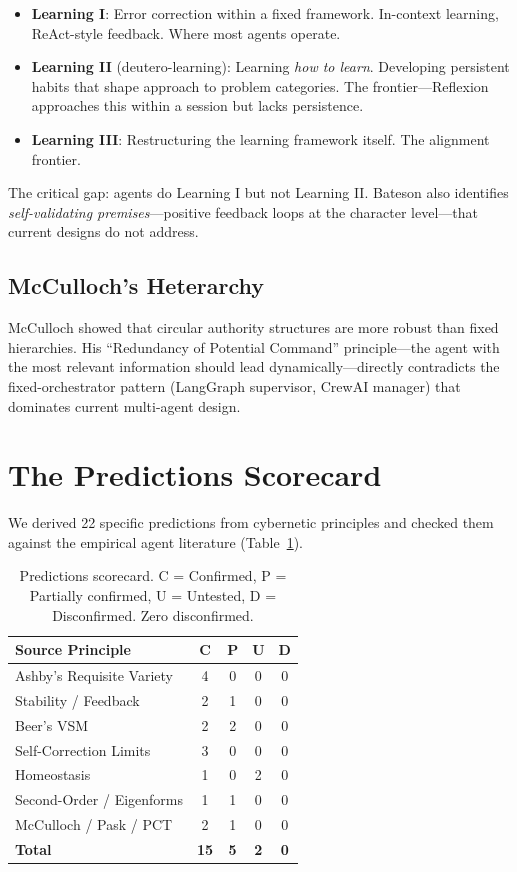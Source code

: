 \documentclass[11pt]{article}
\begin{document}
\begin{itemize}
\item \textbf{Learning I}: Error correction within a fixed framework. In-context learning, ReAct-style feedback. Where most agents operate.
\item \textbf{Learning II} (deutero-learning): Learning \emph{how to learn}. Developing persistent habits that shape approach to problem categories. The frontier---Reflexion approaches this within a session but lacks persistence.
\item \textbf{Learning III}: Restructuring the learning framework itself. The alignment frontier.
\end{itemize}

The critical gap: agents do Learning I but not Learning II. Bateson also identifies \emph{self-validating premises}---positive feedback loops at the character level---that current designs do not address.

\subsection{McCulloch's Heterarchy}

McCulloch \citeyear{mcculloch1945heterarchy} showed that circular authority structures are more robust than fixed hierarchies. His ``Redundancy of Potential Command'' principle---the agent with the most relevant information should lead dynamically---directly contradicts the fixed-orchestrator pattern (LangGraph supervisor, CrewAI manager) that dominates current multi-agent design.

\section{The Predictions Scorecard}

We derived 22 specific predictions from cybernetic principles and checked them against the empirical agent literature (Table~\ref{tab:predictions}).

\begin{table}[t]
\centering
\small
\begin{tabular}{lcccc}
\toprule
\textbf{Source Principle} & \textbf{C} & \textbf{P} & \textbf{U} & \textbf{D} \\
\midrule
Ashby's Requisite Variety & 4 & 0 & 0 & 0 \\
Stability / Feedback & 2 & 1 & 0 & 0 \\
Beer's VSM & 2 & 2 & 0 & 0 \\
Self-Correction Limits & 3 & 0 & 0 & 0 \\
Homeostasis & 1 & 0 & 2 & 0 \\
Second-Order / Eigenforms & 1 & 1 & 0 & 0 \\
McCulloch / Pask / PCT & 2 & 1 & 0 & 0 \\
\midrule
\textbf{Total} & \textbf{15} & \textbf{5} & \textbf{2} & \textbf{0} \\
\bottomrule
\end{tabular}
\caption{Predictions scorecard. C = Confirmed, P = Partially confirmed, U = Untested, D = Disconfirmed. Zero disconfirmed.}
\label{tab:predictions}
\end{table}
\end{document}

